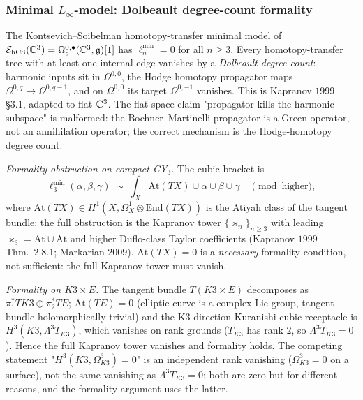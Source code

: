 \subsubsection{Minimal $L_\infty$-model: Dolbeault degree-count
formality}

\begin{theorem}
\label{wn:thm:spine-minimal-model}
The Kontsevich--Soibelman homotopy-transfer minimal model of
$\mathcal{E}_{\mathrm{hCS}}(\mathbb{C}^3) = \Omega^{0,\bullet}_c(\mathbb{C}^3, \mathfrak{g})[1]$ has
$\ell_n^{\min} = 0$ for all $n \geq 3$. Every homotopy-transfer tree
with at least one internal edge vanishes by a \emph{Dolbeault
degree count}: harmonic inputs sit in $\Omega^{0,0}$, the Hodge
homotopy propagator maps $\Omega^{0,q} \to \Omega^{0, q-1}$, and on
$\Omega^{0, 0}$ its target $\Omega^{0,-1}$ vanishes. This is Kapranov
$1999$ \S 3.1, adapted to flat $\mathbb{C}^3$. The flat-space claim
"propagator kills the harmonic subspace" is malformed: the
Bochner--Martinelli propagator is a Green operator, not an
annihilation operator; the correct mechanism is the Hodge-homotopy
degree count.

\emph{Formality obstruction on compact CY$_3$.} The cubic bracket is
\[
\ell_3^{\min}(\alpha, \beta, \gamma) \;\sim\;
\int_X \mathrm{At}(TX) \cup \alpha \cup \beta \cup \gamma
\quad\pmod{\text{higher}},
\]
where $\mathrm{At}(TX) \in H^1(X, \Omega^1_X \otimes \mathrm{End}(TX))$
is the Atiyah class of the tangent bundle; the full obstruction is the
Kapranov tower $\{\varkappa_n\}_{n \geq 3}$ with leading
$\varkappa_3 = \mathrm{At} \cup \mathrm{At}$ and higher Duflo-class Taylor
coefficients (Kapranov $1999$ Thm.~2.8.1; Markarian $2009$).
$\mathrm{At}(TX) = 0$ is a \emph{necessary} formality condition, not
sufficient: the full Kapranov tower must vanish.

\emph{Formality on $K3 \times E$.} The tangent bundle
$T(K3 \times E)$ decomposes as $\pi_1^*TK3 \oplus \pi_2^*TE$;
$\mathrm{At}(TE) = 0$ (elliptic curve is a complex Lie group, tangent
bundle holomorphically trivial) and the K3-direction Kuranishi cubic
receptacle is $H^3(K3, \Lambda^3 T_{K3})$, which vanishes on rank
grounds ($T_{K3}$ has rank $2$, so $\Lambda^3 T_{K3} = 0$). Hence the
full Kapranov tower vanishes and formality holds. The competing
statement "$H^3(K3, \Omega^3_{K3}) = 0$" is an independent rank
vanishing ($\Omega^3_{K3} = 0$ on a surface), not the same vanishing as
$\Lambda^3 T_{K3} = 0$; both are zero but for different reasons, and
the formality argument uses the latter.
\end{theorem}

